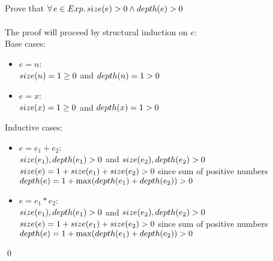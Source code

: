 \subsection{}

Prove that $\forall\, e \in Exp.\, size(e) > 0 \wedge depth(e) > 0$\\\\
The proof will proceed by structural induction on $e$:\\
Base cases:
\begin{itemize}
	\item $e = n$:\\
	      $size( n ) = 1 \ge 0$ and $depth( n ) = 1 > 0$
	\item $e = x$:\\
	      $size( x ) = 1 \ge 0$ and $depth( x ) = 1 > 0$
\end{itemize}
Inductive cases:
\begin{itemize}
	\item $e = e_1 + e_2$:\\
	      $size(e_1), depth(e_1) > 0$ and $size(e_2), depth(e_2) > 0$\\
	      $size(e) = 1 + size(e_1) + size(e_2) > 0$ since sum of positive numbers\\
	      $depth(e) = 1 + \max(depth(e_1) + depth(e_2)) > 0$
	\item $e = e_1 * e_2$:\\
	      $size(e_1), depth(e_1) > 0$ and $size(e_2), depth(e_2) > 0$\\
	      $size(e) = 1 + size(e_1) + size(e_2) > 0$ since sum of positive numbers\\
	      $depth(e) = 1 + \max(depth(e_1) + depth(e_2)) > 0$
\end{itemize}
\qed
